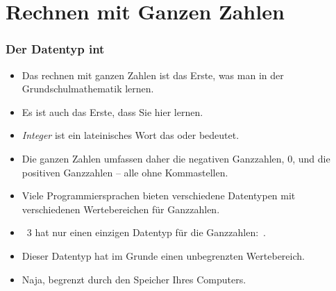 \documentclass[aspectratio=169,mathserif,notheorems]{beamer}%
\begin{document}
\section{Rechnen mit Ganzen Zahlen}%
%
\begin{frame}%
\frametitle{Der Datentyp int}%
\begin{itemize}%
\item Das rechnen mit ganzen Zahlen ist das Erste, was man in der Grundschulmathematik lernen.%
\item<2-> Es ist auch das Erste, dass Sie hier lernen.%
\item<3-> \emph{Integer} ist ein lateinisches Wort das  oder  bedeutet.%
\item<4-> Die ganzen Zahlen umfassen daher die negativen Ganzzahlen, 0, und die positiven Ganzzahlen -- alle ohne Kommastellen. %
\item<5-> Viele Programmiersprachen bieten verschiedene Datentypen mit verschiedenen Wertebereichen für Ganzzahlen.%
\item<8-> \python~3 hat nur einen einzigen Datentyp für die Ganzzahlen:~.%
\item<9-> Dieser Datentyp hat im Grunde einen unbegrenzten Wertebereich.%
\item<10-> Naja, begrenzt durch den Speicher Ihres Computers.%
\end{itemize}%
\end{frame}%
%
\end{document}
